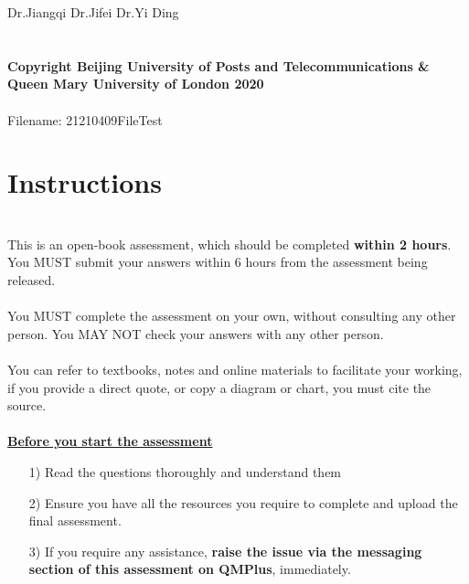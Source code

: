 \documentclass[11pt]{article}
\begin{document}
	\hspace{2em}Dr.Jiangqi Dr.Jifei Dr.Yi Ding
	~\\~\\~\\
	\textbf{\footnotesize Copyright  Beijing University of Posts and Telecommunications \&  Queen Mary University of London 2020}\\
	~\\
	Filename: 21210409FileTest
	
	
	\newpage
	\thispagestyle{empty}
	\part*{{\Large Instructions}}
	~\\
	This is an open-book assessment, which should be completed \textbf{within 2 hours}. You MUST submit your answers within 6 hours from the assessment being released.\\
	~\\
	
	You MUST complete the assessment on your own, without consulting any other person. You MAY NOT check your answers with any other person.\\
	~\\
	
	You can refer to textbooks, notes and online materials to facilitate your working, if you provide a direct quote, or copy a diagram or chart, you must cite the source.\\
	~\\
	
	\textbf{\underline{Before you start the assessment}}
	\begin{enumerate}
		\item[1) ] Read the questions thoroughly and understand them
		\item[2) ] Ensure you have all the resources you require to complete and upload the final assessment.
		\item[3) ] If you require any assistance, \textbf{raise the issue via the messaging section of this assessment on QMPlus}, immediately.
	\end{enumerate}
	~\\
	
\end{document}
